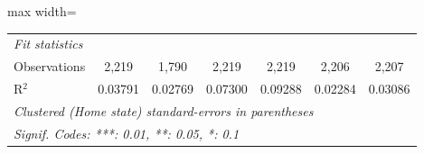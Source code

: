 \begin{adjustbox}{max width=\linewidth}
\begin{tabular}{lcccccc}
      \midrule
      \emph{Fit statistics}\\
      Observations                  & 2,219          & 1,790   & 2,219                  & 2,219        & 2,206        & 2,207\\  
      R$^2$                         & 0.03791        & 0.02769 & 0.07300                & 0.09288      & 0.02284      & 0.03086\\  
      \midrule \midrule
      \multicolumn{7}{l}{\emph{Clustered (Home state) standard-errors in parentheses}}\\
      \multicolumn{7}{l}{\emph{Signif. Codes: ***: 0.01, **: 0.05, *: 0.1}}\\
   \end{tabular}
      \end{adjustbox}
\vspace{3pt}\par{}
